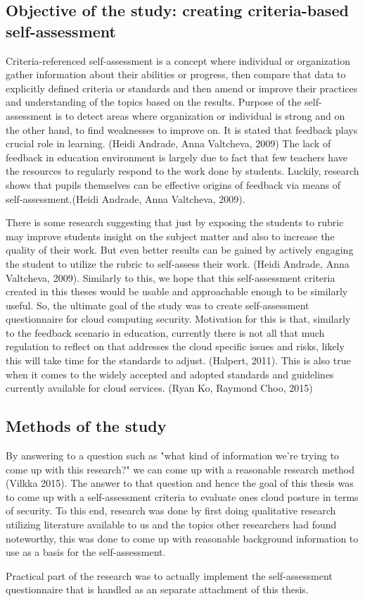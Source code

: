 \documentclass{article}
\begin{document}
\subsection{Objective of the study: creating criteria-based self-assessment}
Criteria-referenced self-assessment is a concept where individual or organization gather information about their abilities or progress, then compare that data to explicitly defined criteria or standards and then amend or improve their practices and understanding of the topics based on the results.
Purpose of the self-assessment is to detect areas where organization or individual is strong and on the other hand, to find weaknesses to improve on. It is stated that feedback plays crucial role in learning. (Heidi Andrade, Anna Valtcheva, 2009)
The lack of feedback in education environment is largely due to fact that few teachers have the resources to regularly respond to the work done by students. Luckily, research shows that pupils themselves can be effective origins of feedback via means of self-assessment.(Heidi Andrade, Anna Valtcheva, 2009).
\par
There is some research suggesting that just by exposing the students to rubric may improve students insight on the subject matter and also to increase the quality of their work. But even better results can be gained by actively engaging the student to utilize the rubric to self-assess their work. (Heidi Andrade, Anna Valtcheva, 2009). Similarly to this, we hope that this self-assessment criteria created in this theses would be usable and approachable enough to be similarly useful. 
So, the ultimate goal of the study was to create self-assessment questionnaire for cloud computing security. Motivation for this is that, similarly to the feedback scenario in education, currently there is not all that much regulation to reflect on that addresses the cloud specific issues and risks, likely this will take time for the standards to adjust. (Halpert, 2011). This is also true when it comes to the widely accepted and adopted standards and guidelines currently available for cloud services. (Ryan Ko, Raymond Choo, 2015)
\subsection{Methods of the study}
By answering to a question such as "what kind of information we're trying to come up with this research?" we can come up with a reasonable research method (Vilkka 2015).
The answer to that question and hence the goal of this thesis was to come up with a self-assessment criteria to evaluate ones cloud posture in terms of security.
To this end, research was done by first doing qualitative research utilizing literature available to us and the topics other researchers had found noteworthy, this was done to come up with reasonable background information to use as a basis for the self-assessment.
\par
Practical part of the research was to actually implement the self-assessment questionnaire that is handled as an separate attachment of this thesis.
\end{document}

